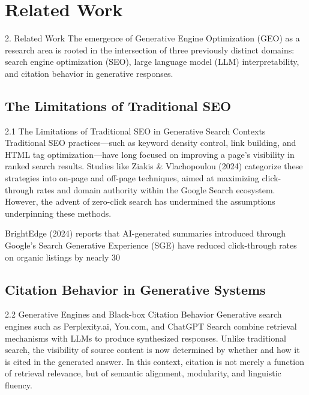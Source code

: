 \section{Related Work}

2. Related Work
The emergence of Generative Engine Optimization (GEO) as a research area is rooted in the intersection of three previously distinct domains: search engine optimization (SEO), large language model (LLM) interpretability, and citation behavior in generative responses.
\subsection{The Limitations of Traditional SEO}

2.1 The Limitations of Traditional SEO in Generative Search Contexts
Traditional SEO practices—such as keyword density control, link building, and HTML tag optimization—have long focused on improving a page’s visibility in ranked search results. Studies like Ziakis & Vlachopoulou (2024) categorize these strategies into on-page and off-page techniques, aimed at maximizing click-through rates and domain authority within the Google Search ecosystem. However, the advent of zero-click search has undermined the assumptions underpinning these methods.

BrightEdge (2024) reports that AI-generated summaries introduced through Google’s Search Generative Experience (SGE) have reduced click-through rates on organic listings by nearly 30%
\subsection{Citation Behavior in Generative Systems}

2.2 Generative Engines and Black-box Citation Behavior
Generative search engines such as Perplexity.ai, You.com, and ChatGPT Search combine retrieval mechanisms with LLMs to produce synthesized responses. Unlike traditional search, the visibility of source content is now determined by whether and how it is cited in the generated answer. In this context, citation is not merely a function of retrieval relevance, but of semantic alignment, modularity, and linguistic fluency.

